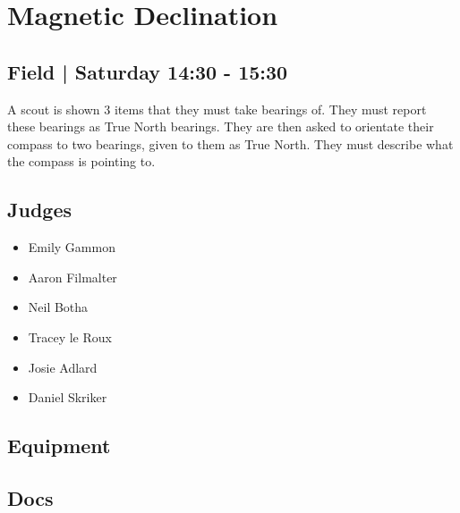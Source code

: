 \documentclass[10pt]{article}
\begin{document}
		\begin{minipage}{\linewidth}
		\setcounter{section}{6}
	\section{Magnetic Declination }
	\subsection*{Field | Saturday 14:30 - 15:30}

	A scout is shown 3 items that they must take bearings of. They must report these bearings as True North bearings. They are then asked to orientate their compass to two bearings, given to them as True North. They must describe what the compass is pointing to.

	\begin{multicols}{2}
	\subsection*{\faUsers \: Judges}
	\begin{itemize}
			\item Emily Gammon
			\item Aaron Filmalter
			\item Neil Botha
			\item Tracey le Roux
			\item Josie Adlard
			\item Daniel Skriker
		\end{itemize}
	\columnbreak
	\subsection*{\faWrench \: Equipment}
	        \vfill\null
        \subsection*{\faFile \: Docs}
     	\end{multicols}


	\vspace{1cm}
	\end{minipage}
\end{document}
